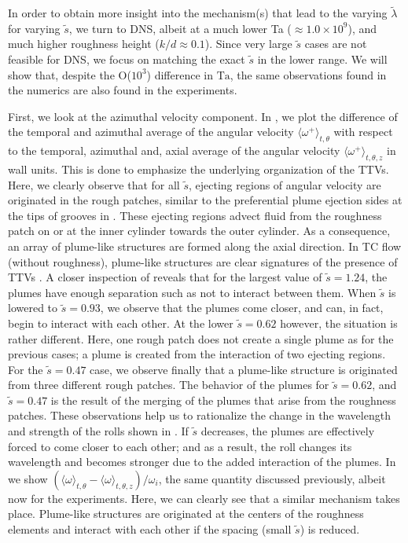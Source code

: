 In order to obtain more insight into the mechanism(s) that lead to the varying $\tilde{\lambda}$ for varying $\tilde{s}$, we turn to DNS, albeit at a much lower Ta ($\approx 1.0\times 10^9$), and much higher roughness height ($k/d \approx 0.1$). Since very large $\tilde s$ cases are not feasible for DNS, we focus on matching the exact $\tilde s$ in the lower range. We will show that, despite the O($10^3$) difference in $\text{Ta}$, the same observations found in the numerics are also found in the experiments. 

First, we look at the azimuthal velocity component. In , we plot the difference of the temporal and azimuthal average of the angular velocity $\langle \omega^+ \rangle_{t,\theta}$ with respect to the temporal, azimuthal and,  axial average of the angular velocity $\langle \omega^+ \rangle_{t,\theta,z}$ in wall units. This is done to emphasize the underlying organization of the TTVs. Here, we clearly observe that for all $\tilde{s}$, ejecting regions of angular velocity are originated in the rough patches, similar to the preferential plume ejection sides at the tips of grooves in \citet{Zhu2016}. These ejecting regions advect fluid from the roughness patch on or at the inner cylinder towards the outer cylinder. As a consequence, an array of plume-like structures are formed along the axial direction. In TC flow (without roughness), plume-like structures are clear signatures of the presence of TTVs \citep{Ostilla-Monico2014b,Ostilla-Monico2014}. A closer inspection of  reveals that for the largest value of $\tilde{s}=1.24$, the plumes have enough separation such as not to interact between them. When $\tilde{s}$ is lowered to $\tilde{s}=0.93$, we observe that the plumes come closer, and can, in fact, begin to interact with each other. At the lower $\tilde{s}=0.62$ however, the situation is rather different. Here, one rough patch does not create a single plume as for the previous cases; a plume is created from the interaction of two ejecting regions. For the $\tilde{s}=0.47$ case, we observe finally that a plume-like structure is originated from three different rough patches. The behavior of the plumes for $\tilde{s}=0.62$, and $\tilde{s}=0.47$ is the result of the merging of the plumes that arise from the roughness patches. These observations help us to rationalize the change in the wavelength and strength of the rolls shown in . If $\tilde{s}$ decreases, the plumes are effectively forced to come closer to each other; and as a result, the roll changes its wavelength and becomes stronger due to the added interaction of the plumes. In  we show $(\langle \omega \rangle_{t,\theta}-\langle \omega \rangle _{t,\theta,z})/\omega_i$, the same quantity discussed previously, albeit now for the experiments. Here, we can clearly see that a similar mechanism takes place. Plume-like structures are originated at the centers of the roughness elements and interact with each other if the spacing (small $\tilde{s}$) is reduced. 

